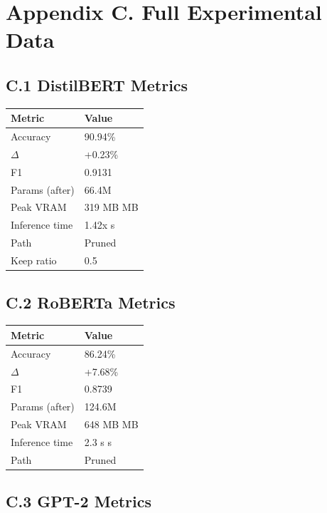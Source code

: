 
\section{Appendix C. Full Experimental Data}

\subsection{C.1 DistilBERT Metrics}

\begin{table}[H]
\centering
\small
\begin{tabular}{ll}
\toprule
\textbf{Metric} & \textbf{Value} \\
\midrule
Accuracy & 90.94\% \\
$\Delta$ & +0.23\% \\
F1 & 0.9131 \\
Params (after) & 66.4M \\
Peak VRAM & 319 MB MB \\
Inference time & 1.42x s \\
Path & Pruned \\
Keep ratio & 0.5 \\
\bottomrule
\end{tabular}
\end{table}

\subsection{C.2 RoBERTa Metrics}

\begin{table}[H]
\centering
\small
\begin{tabular}{ll}
\toprule
\textbf{Metric} & \textbf{Value} \\
\midrule
Accuracy & 86.24\% \\
$\Delta$ & +7.68\% \\
F1 & 0.8739 \\
Params (after) & 124.6M \\
Peak VRAM & 648 MB MB \\
Inference time & 2.3 s s \\
Path & Pruned \\
\bottomrule
\end{tabular}
\end{table}

\subsection{C.3 GPT-2 Metrics}

